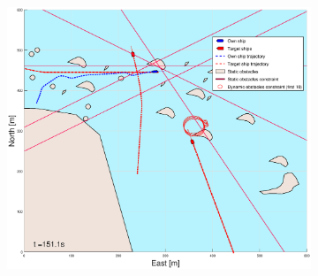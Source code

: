 \begin{figure}[ht]\ContinuedFloat
    \begin{subfigure}[b]{0.494\textwidth}
        \centering
        \includegraphics[width=\textwidth]{Images/Figures/skjergard_m_trafikk_NEW/_Simple_0fig1_time=151}

\end{subfigure}
\end{figure}
